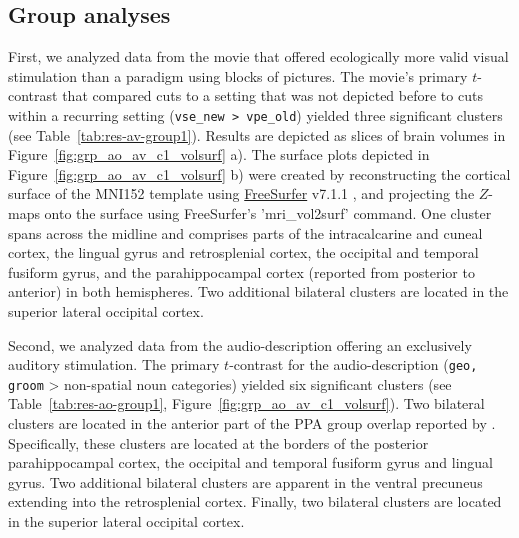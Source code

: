 \documentclass[english,11pt]{article}
\begin{document}
\subsection*{Group analyses}

First, we analyzed data from the movie that offered ecologically more valid
visual stimulation than a paradigm using blocks of pictures.
The movie's primary $t$-contrast that compared cuts to a setting that was not
depicted before to cuts within a recurring setting (\texttt{vse\_new >
vpe\_old}) yielded three significant clusters (see
Table~\ref{tab:res-av-group1}).
Results are depicted as slices of brain volumes in
Figure~\ref{fig:grp_ao_av_c1_volsurf} a).
The surface plots depicted in Figure~\ref{fig:grp_ao_av_c1_volsurf} b) were
created by reconstructing the cortical surface of the MNI152 template using
\href{https://surfer.nmr.mgh.harvard.edu}{FreeSurfer} v7.1.1
\citep{dale1999cortical}, and projecting the $Z$-maps onto the surface using
FreeSurfer's 'mri\_vol2surf' command.
One cluster spans across the midline and comprises parts of the intracalcarine
and cuneal cortex, the lingual gyrus and retrosplenial cortex, the occipital
and temporal fusiform gyrus, and the parahippocampal cortex (reported from
posterior to anterior) in both hemispheres.
Two additional bilateral clusters are located in the superior lateral
occipital cortex.

Second, we analyzed data from the audio-description offering an exclusively
auditory stimulation.
The primary $t$-contrast for the audio-description (\texttt{geo, groom} >
non-spatial noun categories) yielded six significant clusters (see
Table~\ref{tab:res-ao-group1}, Figure~\ref{fig:grp_ao_av_c1_volsurf}).
Two bilateral clusters are located in the anterior part of the PPA group
overlap reported by \citet{sengupta2016extension}.
Specifically, these clusters are located at the borders of the posterior
parahippocampal cortex, the occipital and temporal fusiform gyrus and lingual
gyrus.
Two additional bilateral clusters are apparent in the ventral precuneus
extending into the retrosplenial cortex.
Finally, two bilateral clusters are located in the superior lateral occipital
cortex.
\end{document}

